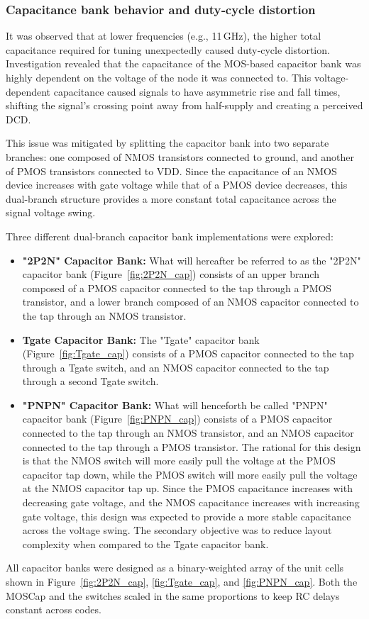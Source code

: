 \subsubsection{Capacitance bank behavior and duty‑cycle distortion}

It was observed that at lower frequencies (e.g., 11\,GHz), the higher total capacitance required for tuning unexpectedly caused duty‑cycle distortion. Investigation revealed that the capacitance of the MOS-based capacitor bank was highly dependent on the voltage of the node it was connected to. This voltage-dependent capacitance caused signals to have asymmetric rise and fall times, shifting the signal's crossing point away from half-supply and creating a perceived DCD.

This issue was mitigated by splitting the capacitor bank into two separate branches: one composed of NMOS transistors connected to ground, and another of PMOS transistors connected to VDD. Since the capacitance of an NMOS device increases with gate voltage while that of a PMOS device decreases, this dual-branch structure provides a more constant total capacitance across the signal voltage swing.

Three different dual-branch capacitor bank implementations were explored:
\begin{itemize}
    \item \textbf{"2P2N" Capacitor Bank:} What will hereafter be referred to as the "2P2N" capacitor bank (Figure~\ref{fig:2P2N_cap}) consists of an upper branch composed of a PMOS capacitor connected to the tap through a PMOS transistor, and a lower branch composed of an NMOS capacitor connected to the tap through an NMOS transistor. 
    \item \textbf{Tgate Capacitor Bank:} The "Tgate" capacitor bank (Figure~\ref{fig:Tgate_cap}) consists of a PMOS capacitor connected to the tap through a Tgate switch, and an NMOS capacitor connected to the tap through a second Tgate switch.
    \item \textbf{"PNPN" Capacitor Bank:} What will henceforth be called "PNPN" capacitor bank (Figure~\ref{fig:PNPN_cap}) consists of a PMOS capacitor connected to the tap through an NMOS transistor, and an NMOS capacitor connected to the tap through a PMOS transistor. The rational for this design is that the NMOS switch will more easily pull the voltage at the PMOS capacitor tap down, while the PMOS switch will more easily pull the voltage at the NMOS capacitor tap up. Since the PMOS capacitance increases with decreasing gate voltage, and the NMOS capacitance increases with increasing gate voltage, this design was expected to provide a more stable capacitance across the voltage swing. The secondary objective was to reduce layout complexity when compared to the Tgate capacitor bank.
\end{itemize}
All capacitor banks were designed as a binary-weighted array of the unit cells shown in Figure~\ref{fig:2P2N_cap}, \ref{fig:Tgate_cap}, and \ref{fig:PNPN_cap}. Both the MOSCap and the switches scaled in the same proportions to keep RC delays constant across codes. 


